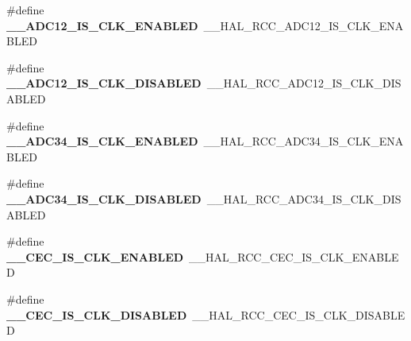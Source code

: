 \begin{DoxyCompactItemize}
\item 
\#define {\bfseries \+\_\+\+\_\+\+A\+D\+C12\+\_\+\+I\+S\+\_\+\+C\+L\+K\+\_\+\+E\+N\+A\+B\+L\+ED}~\+\_\+\+\_\+\+H\+A\+L\+\_\+\+R\+C\+C\+\_\+\+A\+D\+C12\+\_\+\+I\+S\+\_\+\+C\+L\+K\+\_\+\+E\+N\+A\+B\+L\+ED\hypertarget{group___h_a_l___r_c_c___aliased_ga4ba622ec6ed0408b17c9c68523fa6629}{}\label{group___h_a_l___r_c_c___aliased_ga4ba622ec6ed0408b17c9c68523fa6629}

\item 
\#define {\bfseries \+\_\+\+\_\+\+A\+D\+C12\+\_\+\+I\+S\+\_\+\+C\+L\+K\+\_\+\+D\+I\+S\+A\+B\+L\+ED}~\+\_\+\+\_\+\+H\+A\+L\+\_\+\+R\+C\+C\+\_\+\+A\+D\+C12\+\_\+\+I\+S\+\_\+\+C\+L\+K\+\_\+\+D\+I\+S\+A\+B\+L\+ED\hypertarget{group___h_a_l___r_c_c___aliased_ga9464b6c06f15be9e00a1c1ed79dbe8d6}{}\label{group___h_a_l___r_c_c___aliased_ga9464b6c06f15be9e00a1c1ed79dbe8d6}

\item 
\#define {\bfseries \+\_\+\+\_\+\+A\+D\+C34\+\_\+\+I\+S\+\_\+\+C\+L\+K\+\_\+\+E\+N\+A\+B\+L\+ED}~\+\_\+\+\_\+\+H\+A\+L\+\_\+\+R\+C\+C\+\_\+\+A\+D\+C34\+\_\+\+I\+S\+\_\+\+C\+L\+K\+\_\+\+E\+N\+A\+B\+L\+ED\hypertarget{group___h_a_l___r_c_c___aliased_ga5f63de772d3934e3fd5e31cfd91ec6de}{}\label{group___h_a_l___r_c_c___aliased_ga5f63de772d3934e3fd5e31cfd91ec6de}

\item 
\#define {\bfseries \+\_\+\+\_\+\+A\+D\+C34\+\_\+\+I\+S\+\_\+\+C\+L\+K\+\_\+\+D\+I\+S\+A\+B\+L\+ED}~\+\_\+\+\_\+\+H\+A\+L\+\_\+\+R\+C\+C\+\_\+\+A\+D\+C34\+\_\+\+I\+S\+\_\+\+C\+L\+K\+\_\+\+D\+I\+S\+A\+B\+L\+ED\hypertarget{group___h_a_l___r_c_c___aliased_ga93f6d4d2538e3cffb09d7ceda988c85c}{}\label{group___h_a_l___r_c_c___aliased_ga93f6d4d2538e3cffb09d7ceda988c85c}

\item 
\#define {\bfseries \+\_\+\+\_\+\+C\+E\+C\+\_\+\+I\+S\+\_\+\+C\+L\+K\+\_\+\+E\+N\+A\+B\+L\+ED}~\+\_\+\+\_\+\+H\+A\+L\+\_\+\+R\+C\+C\+\_\+\+C\+E\+C\+\_\+\+I\+S\+\_\+\+C\+L\+K\+\_\+\+E\+N\+A\+B\+L\+ED\hypertarget{group___h_a_l___r_c_c___aliased_gaa689c0774ae390c72456584c62c95e7d}{}\label{group___h_a_l___r_c_c___aliased_gaa689c0774ae390c72456584c62c95e7d}

\item 
\#define {\bfseries \+\_\+\+\_\+\+C\+E\+C\+\_\+\+I\+S\+\_\+\+C\+L\+K\+\_\+\+D\+I\+S\+A\+B\+L\+ED}~\+\_\+\+\_\+\+H\+A\+L\+\_\+\+R\+C\+C\+\_\+\+C\+E\+C\+\_\+\+I\+S\+\_\+\+C\+L\+K\+\_\+\+D\+I\+S\+A\+B\+L\+ED\hypertarget{group___h_a_l___r_c_c___aliased_ga737ee1eac2e1da1c1296e4d61254af98}{}\label{group___h_a_l___r_c_c___aliased_ga737ee1eac2e1da1c1296e4d61254af98}


\end{DoxyCompactItemize}
